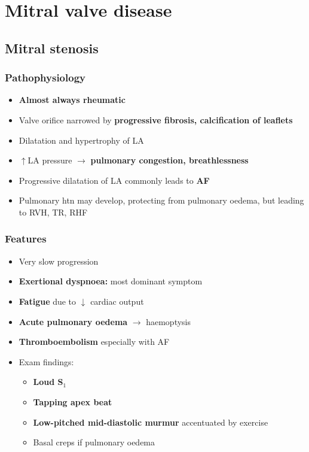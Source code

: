 \documentclass[
  12pt,
]{memoir}
\providecommand{\tightlist}{%
  \setlength{\itemsep}{0pt}\setlength{\parskip}{0pt}}
\begin{document}
\hypertarget{mitral-valve-disease}{%
\section{Mitral valve disease}\label{mitral-valve-disease}}

\hypertarget{mitral-stenosis}{%
\subsection{Mitral stenosis}\label{mitral-stenosis}}

\hypertarget{pathophysiology-1}{%
\subsubsection{Pathophysiology}\label{pathophysiology-1}}

\begin{itemize}
\tightlist
\item
  \textbf{Almost always rheumatic}
\item
  Valve orifice narrowed by \textbf{progressive fibrosis, calcification
  of leaflets}
\item
  Dilatation and hypertrophy of LA
\item
  \(\uparrow\)LA pressure \(\rightarrow\) \textbf{pulmonary congestion,
  breathlessness}
\item
  Progressive dilatation of LA commonly leads to \textbf{AF}
\item
  Pulmonary htn may develop, protecting from pulmonary oedema, but
  leading to RVH, TR, RHF
\end{itemize}

\hypertarget{features-7}{%
\subsubsection{Features}\label{features-7}}

\begin{itemize}
\tightlist
\item
  Very slow progression
\item
  \textbf{Exertional dyspnoea:} most dominant symptom
\item
  \textbf{Fatigue} due to \(\downarrow\) cardiac output
\item
  \textbf{Acute pulmonary oedema} \(\rightarrow\) haemoptysis
\item
  \textbf{Thromboembolism} especially with AF
\item
  Exam findings:

  \begin{itemize}
  \tightlist
  \item
    \textbf{Loud S\(_1\)}
  \item
    \textbf{Tapping apex beat}
  \item
    \textbf{Low-pitched mid-diastolic murmur} accentuated by exercise
  \item
    Basal creps if pulmonary oedema
  \end{itemize}
\end{itemize}
\end{document}

